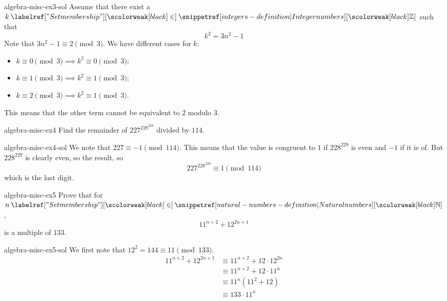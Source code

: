 \documentclass[preview]{standalone}
\begin{document}
\begin{snippetsolution}{algebra-misc-ex3-sol}{}
    Assume that there exist a \(k\in\integers\) such that
    \[
        k^2 = 3n^2 - 1
    \]
    Note that \(3n^2 - 1 \equiv 2 \pmod{3}\).
    We have different cases for \(k\):
    \begin{itemize}
        \item \(k \equiv 0 \pmod{3} \implies k^2 \equiv 0 \pmod{3}\);
        \item \(k \equiv 1 \pmod{3} \implies k^2 \equiv 1 \pmod{3}\);
        \item \(k \equiv 2 \pmod{3} \implies k^2 \equiv 1 \pmod{3}\).
    \end{itemize}
    This means that the other term cannot be equivalent to \(2\) modulo \(3\).
\end{snippetsolution}

\begin{snippetexercise}{algebra-misc-ex4}{}
    Find the remainder of \(227^{228^{229}}\) divided by \(114\).
\end{snippetexercise}

\begin{snippetsolution}{algebra-misc-ex4-sol}{}
    We note that \(227 \equiv -1 \pmod{114}\).
    This means that the value is congruent to \(1\) if \(228^{229}\) is even
    and \(-1\) if it is of. But \(228^{229}\) is clearly even, so the result,
    so
    \[
        227^{228^{229}} \equiv 1 \pmod{114}
    \]
    which is the last digit.
\end{snippetsolution}

\begin{snippetexercise}{algebra-misc-ex5}{}
    Prove that for \(n\in\naturalnumbers\),
    \[
        11^{n+2} + 12^{2n+1}
    \]
    is a multiple of \(133\).
\end{snippetexercise}

\begin{snippetsolution}{algebra-misc-ex5-sol}{}
    We first note that \(12^2 = 144 \equiv 11 \pmod{133}\).
    \begin{align*}
        11^{n+2} + 12^{2n+1} &\equiv 11^{n+2} + 12 \cdot 12^{2n} \\
        &\equiv 11^{n+2} + 12 \cdot 11^n \\
        &\equiv 11^n (11^2 + 12) \\
        &\equiv 133 \cdot 11^n
    \end{align*}
\end{snippetsolution}
\end{document}
